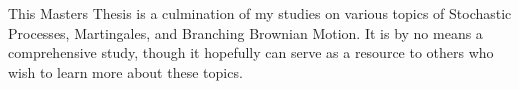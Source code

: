 \authorcontributions

This Masters Thesis is a culmination of my studies on various topics of Stochastic Processes, Martingales, and Branching Brownian Motion. It is by no means a comprehensive study, though it hopefully can serve as a resource to others who wish to learn more about these topics.